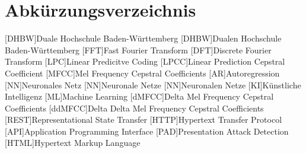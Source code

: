 \section*{Abkürzungsverzeichnis}
\begin{acronym}
  [DHBW]{Duale Hochschule Ba\-den-\-Würt\-tem\-berg}
  [DHBW]{Dualen Hochschule Ba\-den-\-Würt\-tem\-berg}
  [FFT]{Fast Fourier Transform}
  [DFT]{Discrete Fourier Transform}
  [LPC]{Linear Predicitve Coding}
  [LPCC]{Linear Prediction Cepstral Coefficient}
  [MFCC]{Mel Frequency Cepstral Coefficients}
  [AR]{Autoregression}
  [NN]{Neuronales Netz}
  [NN]{Neuronale Netze}
  [NN]{Neuronalen Netze}
  [KI]{Künstliche Intelligenz}
  [ML]{Machine Learning}
  [dMFCC]{Delta Mel Frequency Cepstral Coefficients}
  [ddMFCC]{Delta Delta Mel Frequency Cepstral Coefficients}
  [REST]{Representational State Transfer}
  [HTTP]{Hypertext Transfer Protocol}
  [API]{Application Programming Interface}
  [PAD]{Presentation Attack Detection}
  [HTML]{Hypertext Markup Language}

\end{acronym}
\newpage